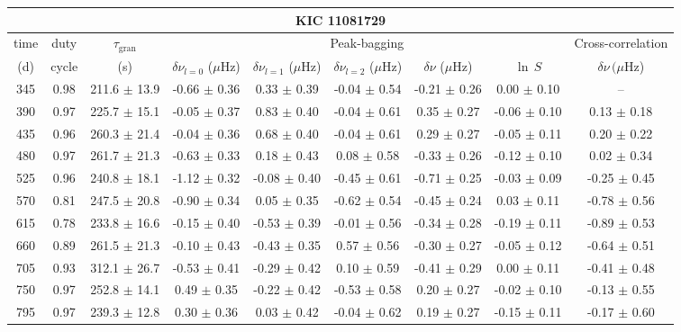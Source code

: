 \documentclass[twocolumn]{aastex61}%
\begin{document}
\begin{table*}[ht]\centering\fontsize{9.}{7.}\selectfont
\begin{tabular}{ccc|ccccc|c}
\multicolumn{9}{c}{KIC 11081729}\\ \hline\hline
time & duty & $\tau_\text{gran}$ &\multicolumn{5}{c|}{Peak-bagging}&Cross-correlation\\
(d)& cycle & (s)&$\delta\nu_{l=0}$ ($\mu$Hz) & $\delta\nu_{l=1}$ ($\mu$Hz) & $\delta\nu_{l=2}$ ($\mu$Hz) & $\delta\nu$ ($\mu$Hz)& $\ln\,S$ & $\delta\nu\,(\mu$Hz)\\\hline
345 & 0.98 & 211.6 $\pm$ 13.9 & -0.66 $\pm$ 0.36 & 0.33 $\pm$ 0.39 & -0.04 $\pm$ 0.54 & -0.21 $\pm$ 0.26 & 0.00 $\pm$ 0.10 & --\\
390 & 0.97 & 225.7 $\pm$ 15.1 & -0.05 $\pm$ 0.37 & 0.83 $\pm$ 0.40 & -0.04 $\pm$ 0.61 & 0.35 $\pm$ 0.27 & -0.06 $\pm$ 0.10 & 0.13 $\pm$ 0.18\\
435 & 0.96 & 260.3 $\pm$ 21.4 & -0.04 $\pm$ 0.36 & 0.68 $\pm$ 0.40 & -0.04 $\pm$ 0.61 & 0.29 $\pm$ 0.27 & -0.05 $\pm$ 0.11 & 0.20 $\pm$ 0.22\\
480 & 0.97 & 261.7 $\pm$ 21.3 & -0.63 $\pm$ 0.33 & 0.18 $\pm$ 0.43 & 0.08 $\pm$ 0.58 & -0.33 $\pm$ 0.26 & -0.12 $\pm$ 0.10 & 0.02 $\pm$ 0.34\\
525 & 0.96 & 240.8 $\pm$ 18.1 & -1.12 $\pm$ 0.32 & -0.08 $\pm$ 0.40 & -0.45 $\pm$ 0.61 & -0.71 $\pm$ 0.25 & -0.03 $\pm$ 0.09 & -0.25 $\pm$ 0.45\\
570 & 0.81 & 247.5 $\pm$ 20.8 & -0.90 $\pm$ 0.34 & 0.05 $\pm$ 0.35 & -0.62 $\pm$ 0.54 & -0.45 $\pm$ 0.24 & 0.03 $\pm$ 0.11 & -0.78 $\pm$ 0.56\\
615 & 0.78 & 233.8 $\pm$ 16.6 & -0.15 $\pm$ 0.40 & -0.53 $\pm$ 0.39 & -0.01 $\pm$ 0.56 & -0.34 $\pm$ 0.28 & -0.19 $\pm$ 0.11 & -0.89 $\pm$ 0.53\\
660 & 0.89 & 261.5 $\pm$ 21.3 & -0.10 $\pm$ 0.43 & -0.43 $\pm$ 0.35 & 0.57 $\pm$ 0.56 & -0.30 $\pm$ 0.27 & -0.05 $\pm$ 0.12 & -0.64 $\pm$ 0.51\\
705 & 0.93 & 312.1 $\pm$ 26.7 & -0.53 $\pm$ 0.41 & -0.29 $\pm$ 0.42 & 0.10 $\pm$ 0.59 & -0.41 $\pm$ 0.29 & 0.00 $\pm$ 0.11 & -0.41 $\pm$ 0.48\\
750 & 0.97 & 252.8 $\pm$ 14.1 & 0.49 $\pm$ 0.35 & -0.22 $\pm$ 0.42 & -0.53 $\pm$ 0.58 & 0.20 $\pm$ 0.27 & -0.02 $\pm$ 0.10 & -0.13 $\pm$ 0.55\\
795 & 0.97 & 239.3 $\pm$ 12.8 & 0.30 $\pm$ 0.36 & 0.03 $\pm$ 0.42 & -0.04 $\pm$ 0.62 & 0.19 $\pm$ 0.27 & -0.15 $\pm$ 0.11 & -0.17 $\pm$ 0.60\\

\end{tabular}
\end{table*}
\end{document}
